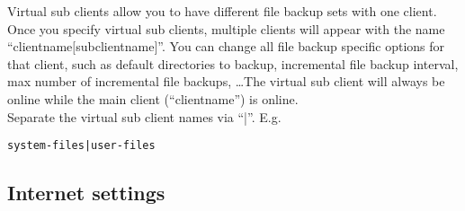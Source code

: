 \documentclass[a4paper,10pt]{article}
\begin{document}
Virtual sub clients allow you to have different file backup sets with one client. Once you specify virtual sub clients,
multiple clients will appear with the name ``clientname$[$subclientname$]$''. You can change all file backup specific options for that client, such as default directories to backup, incremental file backup interval, max number of incremental file backups, \ldots The virtual sub client will always be online while the main client (``clientname'') is online.\\

\noindent Separate the virtual sub client names via ``|''. E.g.
\begin{verbatim}
system-files|user-files
\end{verbatim}

\subsection{Internet settings}
\label{internet_settings}
\end{document}
